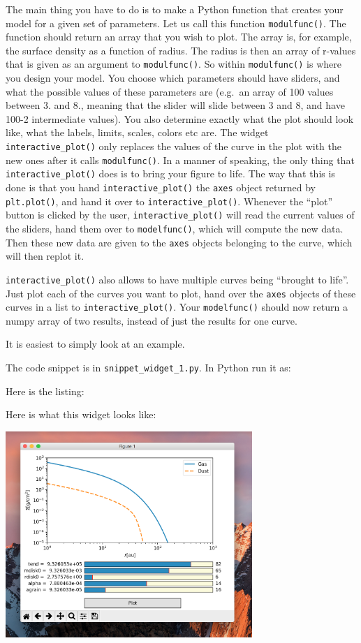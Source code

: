 \documentclass{book}
\newcommand{\code}[1]{{\small\tt #1}}
\begin{document}
The main thing you have to do is to make a Python function that creates your
model for a given set of parameters. Let us call this function
\code{modulfunc()}. The function should return an array that you wish to
plot. The array is, for example, the surface density as a function of
radius. The radius is then an array of r-values that is given as an argument to
\code{modulfunc()}. So within \code{modulfunc()} is where you design your
model. You choose which parameters should have sliders, and what the possible
values of these parameters are (e.g.\ an array of 100 values between 3. and 8.,
meaning that the slider will slide between 3 and 8, and have 100-2 intermediate
values). You also determine exactly what the plot should look like, what the
labels, limits, scales, colors etc are. The widget \code{interactive\_plot()}
only replaces the values of the curve in the plot with the new ones after it
calls \code{modulfunc()}. In a manner of speaking, the only thing that
\code{interactive\_plot()} does is to bring your figure to life. The way that
this is done is that you hand \code{interactive\_plot()} the \code{axes} object
returned by \code{plt.plot()}, and hand it over to \code{interactive\_plot()}.
Whenever the ``plot'' button is clicked by the user, \code{interactive\_plot()}
will read the current values of the sliders, hand them over to
\code{modelfunc()}, which will compute the new data. Then these new data are
given to the \code{axes} objects belonging to the curve, which will then replot
it.

\code{interactive\_plot()} also allows to have multiple curves being ``brought
to life''. Just plot each of the curves you want to plot, hand over the
\code{axes} objects of these curves in a list to \code{interactive\_plot()}.
Your \code{modelfunc()} should now return a numpy array of two results, instead
of just the results for one curve.

It is easiest to simply look at an example.

The code snippet is
in \code{snippet\_widget\_1.py}. In Python run it as:
\begin{codebox}
\end{codebox}
Here is the listing:


Here is what this widget looks like:\\
\centerline{\includegraphics[width=0.7\textwidth]{widget_example_1.png}}
\end{document}
